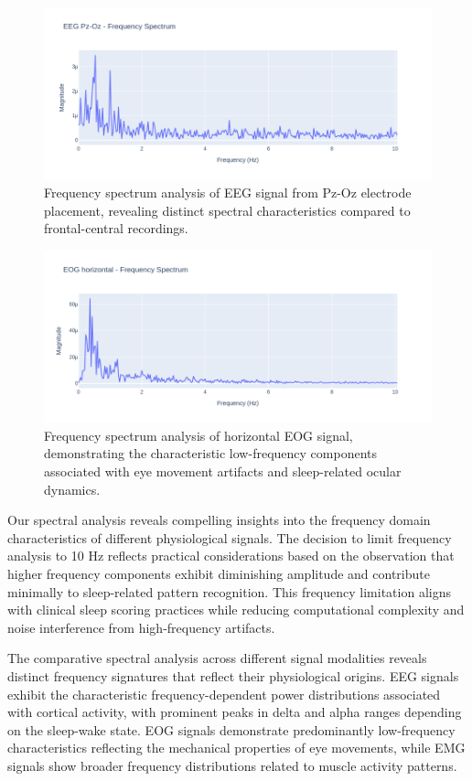 \documentclass[a4paper,12pt,twoside]{article}
\begin{document}
\begin{figure}[h]
  \centering
  \includegraphics[width=0.9\linewidth]{img/frequency spectrum EEG Pz-Oz}
  \caption{Frequency spectrum analysis of EEG signal from Pz-Oz electrode placement, revealing distinct spectral characteristics compared to frontal-central recordings.}
  \label{fig:freq_spectrum_pz_oz}
\end{figure}

\begin{figure}[H]
  \centering
  \includegraphics[width=0.9\linewidth]{img/frequency spectrum EOG Horizontal}
  \caption{Frequency spectrum analysis of horizontal EOG signal, demonstrating the characteristic low-frequency components associated with eye movement artifacts and sleep-related ocular dynamics.}
  \label{fig:freq_spectrum_eog_horizontal}
\end{figure}

Our spectral analysis reveals compelling insights into the frequency domain characteristics of different physiological signals. The decision to limit frequency analysis to 10 Hz reflects practical considerations based on the observation that higher frequency components exhibit diminishing amplitude and contribute minimally to sleep-related pattern recognition. This frequency limitation aligns with clinical sleep scoring practices while reducing computational complexity and noise interference from high-frequency artifacts.

The comparative spectral analysis across different signal modalities reveals distinct frequency signatures that reflect their physiological origins. EEG signals exhibit the characteristic frequency-dependent power distributions associated with cortical activity, with prominent peaks in delta and alpha ranges depending on the sleep-wake state. EOG signals demonstrate predominantly low-frequency characteristics reflecting the mechanical properties of eye movements, while EMG signals show broader frequency distributions related to muscle activity patterns.
\end{document}
